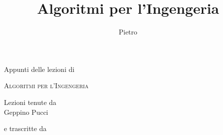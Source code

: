 \title{Algoritmi per l'Ingengeria}

\author{Pietro}

\makeatletter
\begin{titlepage}
	
	\begin{center}
		\vspace*{6cm}

		{\LARGE
            Appunti delle lezioni di
        } 

		\vspace*{0.75cm}

		{\Huge
            \textsc{
                Algoritmi per l'Ingengeria
            }
        } 

		\vspace*{2.75cm}



        Lezioni tenute da\\
        Geppino Pucci

        \vspace*{0.5cm}

        e trascritte da\\
        \@author







    \end{center}

\end{titlepage}
\makeatother
